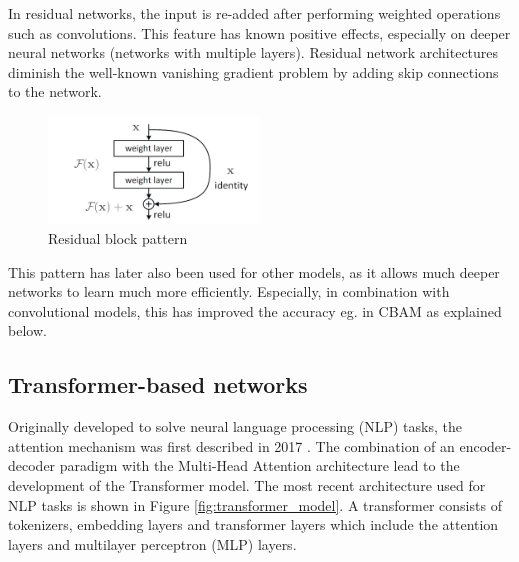 In residual networks, the input is re-added after performing weighted operations such as convolutions. This feature has known positive effects, especially on deeper neural networks (networks with multiple layers). Residual network architectures diminish the well-known vanishing gradient problem by adding skip connections to the network. 

\begin{figure}[H]
    \centering
    \includegraphics[width=0.5\textwidth]{Figures/ResBlockVariants.png}
    \caption{Residual block pattern}
    \label{fig:res_block}
\end{figure}

This pattern has later also been used for other models, as it allows much deeper networks to learn much more efficiently. Especially, in combination with convolutional models, this has improved the accuracy eg. in CBAM as explained below.

\subsection{Transformer-based networks}

Originally developed to solve neural language processing (NLP) tasks, the attention mechanism was first described in 2017 \cite{vaswani_attention_2023}.
The combination of an encoder-decoder paradigm with the Multi-Head Attention architecture lead to the development of the Transformer model. The most recent architecture used for NLP tasks is shown in Figure \ref{fig:transformer_model}.
A transformer consists of tokenizers, embedding layers and transformer layers which include the attention layers and multilayer perceptron (MLP) layers.

